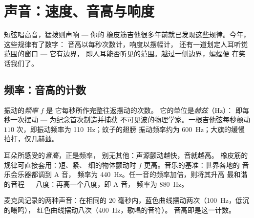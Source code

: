 \chapter{声音：速度、音高与响度}\label{ch:g8:sound-pitch-loudness}

短弦唱高音，猛拨则声响 --- 你的
橡皮筋吉他很多年前就已发现这些规律。今年，这些规律有了数字：
音高以每秒次数计，响度以摆幅计，
还有一道划定人耳听觉范围的窗口 --- 它有边界，
即人耳能否听见的范围。越过一侧边界，蝙蝠便
在笑话我们了。

\section{频率：音高的计数}

\begin{definition}[频率]\label{def:g8:sound-pitch-loudness:frequency}
振动的\emph{频率} $f$ 是
它每秒所作完整往返摆动的次数。
它的单位是\emph{赫兹}（\unit{Hz}）：
即每秒一次摆动 --- 为纪念首次制造并捕获
不可见波的物理学家。一根吉他弦每秒颤动 $110$
次，即振动频率为 \qty{110}{Hz}；蚊子的翅膀
振动频率约为 \qty{600}{Hz}；大旗的缓慢拍打，仅几赫兹。
\end{definition}

\begin{proposition}[音高即频率]\label{prop:g8:sound-pitch-loudness:pitch}
耳朵所感受的\emph{音高}，正是频率，
别无其他：声源颤动越快，音就越高。
橡皮筋的规律可直接套用：短、紧、
细的物体颤动时 $f$ 更高。音乐的基准：世界各地的
音乐会乐器都调到 A 音，
频率为 \qty{440}{Hz}。任一音的频率加倍，则将其升高
最和谐的音程 --- 八度：再高一个八度，即 A 音，
频率为 \qty{880}{Hz}。
\end{proposition}

\begin{omfigure}

{\small 麦克风记录的两种声音：在相同的 $20$
毫秒内，蓝色曲线摆动两次（\qty{100}{Hz}，低沉的嗡鸣），
红色曲线摆动八次（\qty{400}{Hz}，歌唱的音符）。
音高即是这一计数。}
\end{omfigure}

